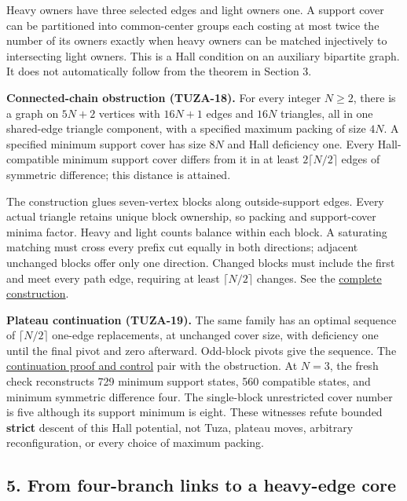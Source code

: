 \documentclass[11pt,a4paper]{article}
\begin{document}
Heavy owners have three selected edges and light owners one. A support cover can be partitioned into common-center groups each costing at most twice the number of its owners exactly when heavy owners can be matched injectively to intersecting light owners. This is a Hall condition on an auxiliary bipartite graph. It does not automatically follow from the theorem in Section 3.

\textbf{Connected-chain obstruction (TUZA-18).} For every integer \(N\ge2\), there is a graph on \(5N+2\) vertices with \(16N+1\) edges and \(16N\) triangles, all in one shared-edge triangle component, with a specified maximum packing of size \(4N\). A specified minimum support cover has size \(8N\) and Hall deficiency one. Every Hall-compatible minimum support cover differs from it in at least \(2\lceil N/2\rceil\) edges of symmetric difference; this distance is attained.

The construction glues seven-vertex blocks along outside-support edges. Every actual triangle retains unique block ownership, so packing and support-cover minima factor. Heavy and light counts balance within each block. A saturating matching must cross every prefix cut equally in both directions; adjacent unchanged blocks offer only one direction. Changed blocks must include the first and meet every path edge, requiring at least \(\lceil N/2\rceil\) changes. See the \href{https://github.com/pappa211/ai-math-experiments/blob/main/problems/TUZA-18/notes/late_star_connected_pivot_obstruction.md}{complete construction}.

\textbf{Plateau continuation (TUZA-19).} The same family has an optimal sequence of \(\lceil N/2\rceil\) one-edge replacements, at unchanged cover size, with deficiency one until the final pivot and zero afterward. Odd-block pivots give the sequence. The \href{https://github.com/pappa211/ai-math-experiments/blob/main/problems/TUZA-19/review/chain_plateau_control.md}{continuation proof and control} pair with the obstruction. At \(N=3\), the fresh check reconstructs 729 minimum support states, 560 compatible states, and minimum symmetric difference four. The single-block unrestricted cover number is five although its support minimum is eight. These witnesses refute bounded \textbf{strict} descent of this Hall potential, not Tuza, plateau moves, arbitrary reconfiguration, or every choice of maximum packing.

\subsection{5. From four-branch links to a heavy-edge core}\label{from-four-branch-links-to-a-heavy-edge-core}
\end{document}
